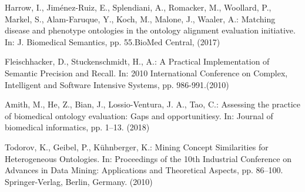 \documentclass[runningheads]{llncs}
\begin{document}
\begin{thebibliography}{8}
Harrow, I., Jim{\'e}nez-Ruiz, E., Splendiani, A., Romacker, M., Woollard, P., Markel, S., Alam-Faruque, Y., Koch, M., Malone, J., Waaler, A.: Matching disease and phenotype ontologies in the ontology alignment evaluation initiative. In: J. Biomedical Semantics, pp. 55.BioMed Central, (2017)

Fleischhacker, D., Stuckenschmidt, H., A.: A Practical Implementation of Semantic Precision and Recall. In: 2010 International Conference on Complex, Intelligent and Software Intensive Systems, pp. 986-991.(2010)

Amith, M., He, Z., Bian, J., Lossio-Ventura, J. A., Tao, C.: Assessing the practice of biomedical ontology evaluation: Gaps and opportunitiesy. In: Journal of biomedical informatics, pp. 1–13. (2018)

Todorov, K., Geibel, P., K\"{u}hnberger, K.: Mining Concept Similarities for Heterogeneous Ontologies. In: Proceedings of the 10th Industrial Conference on Advances in Data Mining: Applications and Theoretical Aspects, pp. 86--100. Springer-Verlag, Berlin, Germany. (2010)

\end{thebibliography}
\end{document}
